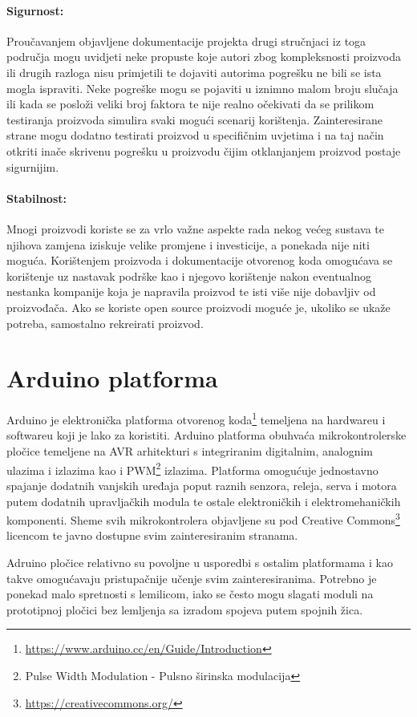 \paragraph{Sigurnost:}
Proučavanjem objavljene dokumentacije projekta drugi stručnjaci iz toga područja mogu uvidjeti neke propuste koje autori zbog kompleksnosti proizvoda ili drugih razloga nisu primjetili te dojaviti autorima pogrešku ne bili se ista mogla ispraviti. 
Neke pogreške mogu se pojaviti u iznimno malom broju slučaja ili kada se posloži veliki broj faktora te nije realno očekivati da se prilikom testiranja proizvoda simulira svaki mogući scenarij korištenja.
Zainteresirane strane mogu dodatno testirati proizvod u specifičnim uvjetima i na taj način otkriti inače skrivenu pogrešku u proizvodu čijim otklanjanjem proizvod postaje sigurnijim.

\paragraph{Stabilnost:}
Mnogi proizvodi koriste se za vrlo važne aspekte rada nekog većeg sustava te njihova zamjena iziskuje velike promjene i investicije, a ponekada nije niti moguća.
Korištenjem proizvoda i dokumentacije otvorenog koda omogućava se korištenje uz nastavak podrške kao i njegovo korištenje nakon eventualnog nestanka kompanije koja je napravila proizvod te isti više nije dobavljiv od proizvođača. 
Ako se koriste open source proizvodi moguće je, ukoliko se ukaže potreba, samostalno rekreirati proizvod.


\section{Arduino platforma}
Arduino je elektronička platforma otvorenog koda\footnote{\url{https://www.arduino.cc/en/Guide/Introduction}} temeljena na hardwareu i softwareu koji je lako za koristiti.
Arduino platforma obuhvaća mikrokontrolerske pločice temeljene na AVR arhitekturi s integriranim digitalnim, analognim ulazima i izlazima kao i PWM\footnote{Pulse Width Modulation - Pulsno širinska modulacija} izlazima.
Platforma omogućuje jednostavno spajanje dodatnih vanjskih uređaja poput raznih senzora, releja, serva i motora putem dodatnih upravljačkih modula te ostale elektroničkih i elektromehaničkih komponenti.
Sheme svih mikrokontrolera objavljene su pod Creative Commons\footnote{\url{https://creativecommons.org/}} licencom te javno dostupne svim zainteresiranim stranama.

Adruino pločice relativno su povoljne u usporedbi s ostalim platformama i kao takve omogućavaju pristupačnije učenje svim zainteresiranima.
Potrebno je ponekad malo spretnosti s lemilicom, iako se često mogu slagati moduli na prototipnoj pločici bez lemljenja sa izradom spojeva putem spojnih žica.

